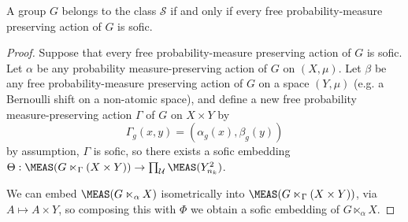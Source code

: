 \begin{theorem}[{\cite{MR2826401}}]
A group $G$ belongs to the class $\mathscr{S}$ if and only if every free probability-measure preserving action of $G$ is sofic.
\end{theorem}
\begin{proof}
Suppose that every free probability-measure preserving action of $G$ is sofic. Let $\alpha$ be any probability measure-preserving action of $G$ on $(X,\mu)$. Let $\beta$ be any free probability-measure preserving action of $G$ on a space $(Y,\mu)$ (e.g. a Bernoulli shift on a non-atomic space), and define a new free probability measure-preserving action $\Gamma$ of $G$ on $X\times Y$ by
\[\Gamma_g(x,y)=(\alpha_g(x),\beta_g(y))\]
by assumption, $\Gamma$ is sofic, so there exists a sofic embedding $\Theta:\MEAS(G\ltimes_\Gamma (X\times Y))\to\prod_\mathcal{U}\MEAS(Y_{n_k}^2)$.

We can embed $\MEAS(G\ltimes_\alpha X)$ isometrically into $\MEAS(G\ltimes_\Gamma (X\times Y))$, via $A\mapsto A\times Y$, so composing this with $\Phi$ we obtain a sofic embedding of $G\ltimes_\alpha X$.\qedhere
\end{proof}


